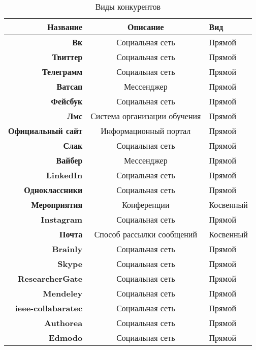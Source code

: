 \begin{longtable}{|r|c|l|} 
\caption{Виды конкурентов} \label{t:competetors0}\\
	  \hline
	\textbf{Название} & \textbf{Описание} & \textbf{Вид} \\ \hline
\textbf{Вк} &Социальная сеть& Прямой \\ \hline
\textbf{Твиттер} &Социальная сеть& Прямой \\ \hline
\textbf{Телеграмм} &Социальная сеть& Прямой \\ \hline
\textbf{Ватсап} &Мессенджер& Прямой \\ \hline
\textbf{Фейсбук} &Социальная сеть& Прямой \\ \hline
\textbf{Лмс} &Система организации обучения& Прямой \\ \hline
\textbf{Официальный сайт} &Информационный портал& Прямой \\ \hline
\textbf{Слак} &Социальная сеть& Прямой \\ \hline
\textbf{Вайбер} &Мессенджер& Прямой \\ \hline
\textbf{LinkedIn} &Социальная сеть& Прямой \\ \hline
\textbf{Одноклассники} &Социальная сеть& Прямой \\ \hline
\textbf{Мероприятия} &Конференции& Косвенный \\ \hline
\textbf{Instagram} &Социальная сеть& Прямой \\ \hline
\textbf{Почта} &Способ рассылки сообщений& Косвенный \\ \hline
\textbf{Brainly} &Социальная сеть& Прямой \\ \hline
\textbf{Skype} &Социальная сеть& Прямой \\ \hline
\textbf{ResearcherGate} &Социальная сеть& Прямой \\ \hline
\textbf{Mendeley} &Социальная сеть& Прямой \\ \hline
\textbf{ieee-collabaratec} &Социальная сеть& Прямой \\ \hline
\textbf{Authorea} &Социальная сеть& Прямой \\ \hline
\textbf{Edmodo} &Социальная сеть& Прямой \\ \hline
\end{longtable}
